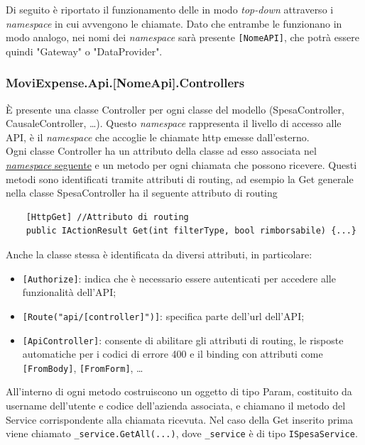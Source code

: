 \noindent Di seguito è riportato il funzionamento delle  in modo \emph{top-down} attraverso i \emph{namespace} in cui avvengono le chiamate. Dato che entrambe le  funzionano in modo analogo, nei nomi dei \emph{namespace} sarà presente \verb+[NomeAPI]+, che potrà essere quindi "Gateway" o "DataProvider".

\subsubsection{MoviExpense.Api.[NomeApi].Controllers}

È presente una classe Controller per ogni classe del modello (SpesaController, CausaleController, \dots). Questo \emph{namespace} rappresenta il livello di accesso alle API, è il \emph{namespace} che accoglie le chiamate http emesse dall'esterno.\\
Ogni classe Controller ha un attributo della classe ad esso associata nel \hyperref[cap:services]{\emph{namespace} seguente} e un metodo per ogni chiamata che possono ricevere. Questi metodi sono identificati tramite attributi di routing, ad esempio la Get generale nella classe SpesaController ha il seguente attributo di routing

\begin{verbatim}
    [HttpGet] //Attributo di routing
    public IActionResult Get(int filterType, bool rimborsabile) {...}
\end{verbatim}

\noindent Anche la classe stessa è identificata da diversi attributi, in particolare:
\begin{itemize}
    \item \verb+[Authorize]+: indica che è necessario essere autenticati per accedere alle funzionalità dell'API;
    \item \verb+[Route("api/[controller]")]+: specifica parte dell'url dell'API;
    \item \verb+[ApiController]+: consente di abilitare gli attributi di routing, le risposte automatiche per i codici di errore 400 e il binding con attributi come \verb+[FromBody]+, \verb+[FromForm]+, \dots
\end{itemize}
All'interno di ogni metodo costruiscono un oggetto di tipo Param, costituito da username dell'utente e codice dell'azienda associata, e chiamano il metodo del Service corrispondente alla chiamata ricevuta. Nel caso della Get inserito prima viene
chiamato \verb+_service.GetAll(...)+, dove \verb+_service+ è di tipo \verb+ISpesaService+.

